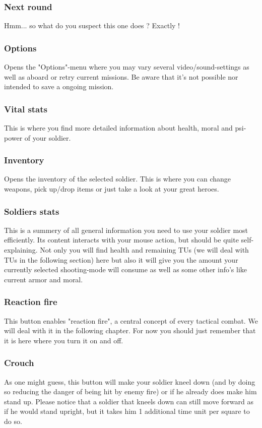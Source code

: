 \subsubsection{Next round}
Hmm... so what do you suspect this one does ? Exactly !
\subsubsection{Options}
Opens the "Options"-menu where you may vary several video/sound-settings as well as aboard or retry current missions. Be aware that it's not possible nor intended to save a ongoing mission.
\subsubsection{Vital stats}
This is where you find more detailed information about health, moral and psi-power of your soldier.
\subsubsection{Inventory}
Opens the inventory of the selected soldier. This is where you can change weapons, pick up/drop items or just take a look at your great heroes.
\subsubsection{Soldiers stats}
This is a summery of all general information you need to use your soldier most efficiently. Its content interacts with your mouse action, but should be quite self-explaining. Not only you will find health and remaining TUs (we will deal with TUs in the following section) here but also it will give you the amount your currently selected shooting-mode will consume as well as some other info's like current armor and moral.
\subsubsection{Reaction fire}
This button enables "reaction fire", a central concept of every tactical combat. We will deal with it in the following chapter. For now you should just remember that it is here where you turn it on and off.
\subsubsection{Crouch}
As one might guess, this button will make your soldier kneel down (and by doing so reducing the danger of being hit by enemy fire) or if he already does make him stand up. Please notice that a soldier that kneels down can still move forward as if he would stand upright, but it takes him 1 additional time unit per square to do so.
